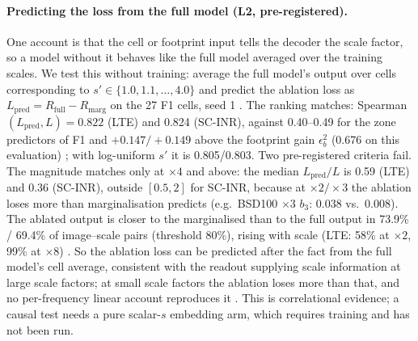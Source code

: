 \paragraph{Predicting the loss from the full model (L2, pre-registered).}
One account is that the cell or footprint input tells the
decoder the scale factor, so a model without it behaves like the full model
averaged over the training scales. We test this without training: average
the full model's output over cells corresponding to $s'\in\{1.0,1.1,\dots,4.0\}$
and predict the ablation loss as $L_{\mathrm{pred}}=R_{\mathrm{full}}-R_{\mathrm{marg}}$
on the 27 F1 cells, seed 1 . The ranking matches:
Spearman$(L_{\mathrm{pred}},L)=0.822$ (LTE) and 0.824 (SC-INR), against
0.40--0.49 for the zone predictors of F1 and $+0.147/+0.149$ above the
footprint gain $\epsilon_b^2$ (0.676 on this evaluation) ; with
log-uniform $s'$ it is 0.805/0.803. Two pre-registered criteria fail. The
magnitude matches only at $\times4$ and above: the median
$L_{\mathrm{pred}}/L$ is 0.59 (LTE) and 0.36 (SC-INR), outside $[0.5,2]$ for
SC-INR, because at $\times2/\times3$ the ablation loses more than
marginalisation predicts (e.g.\ BSD100 $\times3$ $b_3$: 0.038 vs.\ 0.008).
The ablated output is closer to the marginalised than to the full output in
73.9\% / 69.4\% of image--scale pairs (threshold 80\%), rising with scale
(LTE: 58\% at $\times2$, 99\% at $\times8$) . So the ablation loss can be predicted after the fact
from the full model's cell average, consistent with the readout supplying
scale information at large scale factors; at small scale factors the ablation
loses more than that, and no per-frequency linear account reproduces it
. This is correlational evidence; a
causal test needs a pure scalar-$s$ embedding arm, which requires training and
has not been run.

